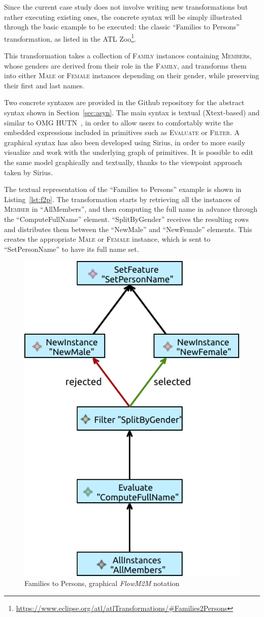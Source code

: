 \documentclass[a4paper]{scrartcl}
\newcommand*{\class}[1]{\textsc{#1}}
\newcommand{\FlowMM}{\emph{FlowM2M}\xspace}
\begin{document}
Since the current case study does not involve writing new
transformations but rather executing existing ones, the concrete
syntax will be simply illustrated through the basic example to be
executed: the classic ``Families to Persons'' transformation, as
listed in the ATL
Zoo\footnote{\url{https://www.eclipse.org/atl/atlTransformations/#Families2Persons}}.

This transformation takes a collection of \class{Family} instances
containing \class{Member}s, whose genders are derived from their role
in the \class{Family}, and transforms them into either \class{Male} or
\class{Female} instances depending on their gender, while preserving
their first and last names.

Two concrete syntaxes are provided in the Github repository for the
abstract syntax shown in Section~\ref{sec:asyn}. The main syntax is
textual (Xtext-based) and similar to OMG HUTN~\cite{hutn2004}, in
order to allow users to comfortably write the embedded expressions
included in primitives such as \class{Evaluate} or \class{Filter}. A
graphical syntax has also been developed using Sirius, in order to
more easily visualize and work with the underlying graph of
primitives. It is possible to edit the same model graphically and
textually, thanks to the viewpoint approach taken by Sirius.



The textual representation of the ``Families to Persons'' example is
shown in Listing~\ref{lst:f2p}. The transformation starts by
retrieving all the instances of \class{Member} in ``AllMembers'', and
then computing the full name in advance through the
``ComputeFullName'' element. ``SplitByGender'' receives the resulting
rows and distributes them between the ``NewMale'' and ``NewFemale''
elements. This creates the appropriate \class{Male} or \class{Female}
instance, which is sent to ``SetPersonName'' to have its full name
set.

\begin{figure}
  \centering
  \includegraphics[width=.4\textwidth]{families2persons}
  \caption{Families to Persons, graphical \FlowMM notation}
  \label{fig:f2p}
\end{figure}
\end{document}
